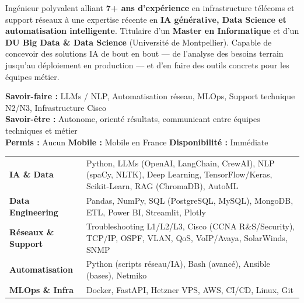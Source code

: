 \documentclass[11pt,a4paper]{article}
\begin{document}
\cvheader{\textcolor{black}{\LARGE Ingénieur IA \& Data Scientist — Support IT \& Réseaux}}

\noindent
Ingénieur polyvalent alliant \textbf{7+ ans d'expérience} en infrastructure télécoms et support réseaux à une expertise récente en \textbf{IA générative, Data Science et automatisation intelligente}. Titulaire d'un \textbf{Master en Informatique} et d'un \textbf{DU Big Data \& Data Science} (Université de Montpellier). Capable de concevoir des solutions IA de bout en bout — de l'analyse des besoins terrain jusqu'au déploiement en production — et d'en faire des outils concrets pour les équipes métier.

\noindent\vspace{0.4em}
\textbf{Savoir-faire :} LLMs / NLP, Automatisation réseau, MLOps, Support technique N2/N3, Infrastructure Cisco\\
\textbf{Savoir-être :} Autonome, orienté résultats, communicant entre équipes techniques et métier\\
\textbf{Permis :} Aucun \quad \textbf{Mobile :} Mobile en France \quad \textbf{Disponibilité :} Immédiate

\noindent
\begin{tabularx}{\linewidth}{@{} p{3.5cm} X @{}}
\textbf{IA \& Data} & Python, LLMs (OpenAI, LangChain, CrewAI), NLP (spaCy, NLTK), Deep Learning, TensorFlow/Keras, Scikit-Learn, RAG (ChromaDB), AutoML \\
\textbf{Data Engineering} & Pandas, NumPy, SQL (PostgreSQL, MySQL), MongoDB, ETL, Power BI, Streamlit, Plotly \\
\textbf{Réseaux \& Support} & Troubleshooting L1/L2/L3, Cisco (CCNA R\&S/Security), TCP/IP, OSPF, VLAN, QoS, VoIP/Avaya, SolarWinds, SNMP \\
\textbf{Automatisation} & Python (scripts réseau/IA), Bash (avancé), Ansible (bases), Netmiko \\
\textbf{MLOps \& Infra} & Docker, FastAPI, Hetzner VPS, AWS, CI/CD, Linux, Git \\
\end{tabularx}
\end{document}
